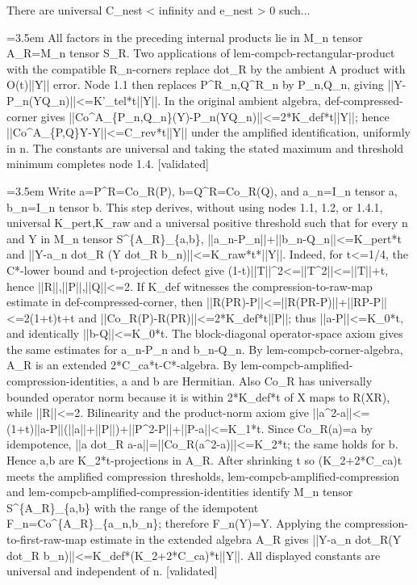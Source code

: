 \documentclass{article}
\newcommand{\step}[1]{\par\noindent\hangindent=3.5em\hangafter=1%
  \makebox[3.5em][l]{\textbf{#1.}}}
\newcommand{\steptag}[1]{\hfill{\small\textsf{[#1]}}}
\begin{document}
\begin{proofbox}{There are universal C\_nest < infinity and e\_nest > 0 such...}
\step{1.4.2} All factors in the preceding internal products lie in M\_n tensor A\_R=M\_n tensor S\_R. Two applications of lem-compcb-rectangular-product with the compatible R\_n-corners replace dot\_R by the ambient A product with O(t)||Y|| error. Node 1.1 then replaces P\textasciicircum{}R\_n,Q\textasciicircum{}R\_n by P\_n,Q\_n, giving ||Y-P\_n(YQ\_n)||<=K'\_tel*t||Y||. In the original ambient algebra, def-compressed-corner gives ||Co\textasciicircum{}A\_\{P\_n,Q\_n\}(Y)-P\_n(YQ\_n)||<=2*K\_def*t||Y||; hence ||Co\textasciicircum{}A\_\{P,Q\}Y-Y||<=C\_rev*t||Y|| under the amplified identification, uniformly in n. The constants are universal and taking the stated maximum and threshold minimum completes node 1.4. \steptag{validated} \\[6pt]
\step{1.4.2.1} Write a=P\textasciicircum{}R=Co\_R(P), b=Q\textasciicircum{}R=Co\_R(Q), and a\_n=I\_n tensor a, b\_n=I\_n tensor b. This step derives, without using nodes 1.1, 1.2, or 1.4.1, universal K\_pert,K\_raw and a universal positive threshold such that for every n and Y in M\_n tensor S\textasciicircum{}\{A\_R\}\_\{a,b\}, ||a\_n-P\_n||+||b\_n-Q\_n||<=K\_pert*t and ||Y-a\_n dot\_R (Y dot\_R b\_n)||<=K\_raw*t*||Y||. Indeed, for t<=1/4, the C*-lower bound and t-projection defect give (1-t)||T||\textasciicircum{}2<=||T\textasciicircum{}2||<=||T||+t, hence ||R||,||P||,||Q||<=2. If K\_def witnesses the compression-to-raw-map estimate in def-compressed-corner, then ||R(PR)-P||<=||R(PR-P)||+||RP-P||<=2(1+t)t+t and ||Co\_R(P)-R(PR)||<=2*K\_def*t||P||; thus ||a-P||<=K\_0*t, and identically ||b-Q||<=K\_0*t. The block-diagonal operator-space axiom gives the same estimates for a\_n-P\_n and b\_n-Q\_n. By lem-compcb-corner-algebra, A\_R is an extended 2*C\_ca*t-C*-algebra. By lem-compcb-amplified-compression-identities, a and b are Hermitian. Also Co\_R has universally bounded operator norm because it is within 2*K\_def*t of X maps to R(XR), while ||R||<=2. Bilinearity and the product-norm axiom give ||a\textasciicircum{}2-a||<= (1+t)||a-P||(||a||+||P||)+||P\textasciicircum{}2-P||+||P-a||<=K\_1*t. Since Co\_R(a)=a by idempotence, ||a dot\_R a-a||=||Co\_R(a\textasciicircum{}2-a)||<=K\_2*t; the same holds for b. Hence a,b are K\_2*t-projections in A\_R. After shrinking t so (K\_2+2*C\_ca)t meets the amplified compression thresholds, lem-compcb-amplified-compression and lem-compcb-amplified-compression-identities identify M\_n tensor S\textasciicircum{}\{A\_R\}\_\{a,b\} with the range of the idempotent F\_n=Co\textasciicircum{}\{A\_R\}\_\{a\_n,b\_n\}; therefore F\_n(Y)=Y. Applying the compression-to-first-raw-map estimate in the extended algebra A\_R gives ||Y-a\_n dot\_R(Y dot\_R b\_n)||<=K\_def*(K\_2+2*C\_ca)*t||Y||. All displayed constants are universal and independent of n. \steptag{validated} \\[4pt]

\end{proofbox}
\end{document}
